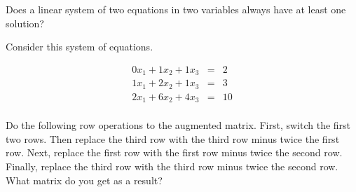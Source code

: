 
Does a linear system of two equations in two variables always have at least one solution?



\endedxproblem






Consider this system of equations.  



\begin{eqnarray*}
0x_1 + 1x_2 + 1x_3 & = & 2 \\
1x_1 + 2x_2 + 1x_3 & = & 3 \\
2x_1 + 6x_2 + 4x_3 & = & 10 \\
\end{eqnarray*}





Do the following row operations to the augmented matrix.  First, switch the first two
rows.  Then replace the third row with the third
row minus twice the first row.  Next, replace the first row with the first
row minus twice the second row.  Finally, replace the third row with the third
row minus twice the second row.  What matrix do you get as a result?  






